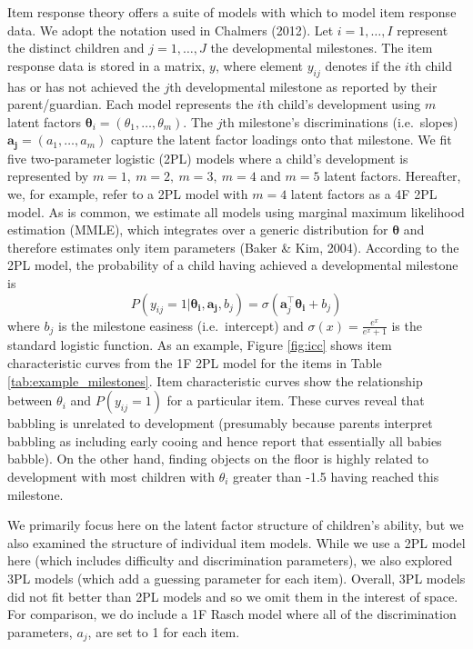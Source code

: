 \documentclass[10pt, letterpaper]{article}
\begin{document}
Item response theory offers a suite of models with which to model item
response data. We adopt the notation used in Chalmers (2012). Let
\(i = 1, \ldots, I\) represent the distinct children and
\(j = 1, \ldots, J\) the developmental milestones. The item response
data is stored in a matrix, \(y\), where element \(y_{ij}\) denotes if
the \(i\)th child has or has not achieved the \(j\)th developmental
milestone as reported by their parent/guardian. Each model represents
the \(i\)th child's development using \(m\) latent factors
\(\boldsymbol{\theta}_{i}=(\theta_1, \dots, \theta_m)\). The \(j\)th
milestone's discriminations (i.e.~slopes)
\(\boldsymbol{a_j}=(a_1, \dots, a_m)\) capture the latent factor
loadings onto that milestone. We fit five two-parameter logistic (2PL)
models where a child's development is represented by
\(m = 1, \ m = 2, \ m = 3, \ m = 4\) and \(m = 5\) latent factors.
Hereafter, we, for example, refer to a 2PL model with \(m = 4\) latent
factors as a 4F 2PL model. As is common, we estimate all models using
marginal maximum likelihood estimation (MMLE), which integrates over a
generic distribution for \(\boldsymbol{\theta}\) and therefore estimates
only item parameters (Baker \& Kim, 2004). According to the 2PL model,
the probability of a child having achieved a developmental milestone is
\[
P(y_{ij} = 1 | \boldsymbol{\theta_i}, \boldsymbol{a_j}, b_j) = \sigma(\boldsymbol{a}_{j}^{\top}\boldsymbol{\theta_i} + b_j)
\] where \(b_j\) is the milestone easiness (i.e.~intercept) and
\(\sigma(x) = \frac{e^x}{e^x + 1}\) is the standard logistic function.
As an example, Figure \ref{fig:icc} shows item characteristic curves
from the 1F 2PL model for the items in Table
\ref{tab:example_milestones}. Item characteristic curves show the
relationship between \(\theta_i\) and \(P(y_{ij} = 1)\) for a particular
item. These curves reveal that babbling is unrelated to development
(presumably because parents interpret babbling as including early cooing
and hence report that essentially all babies babble). On the other hand,
finding objects on the floor is highly related to development with most
children with \(\theta_i\) greater than -1.5 having reached this
milestone.

We primarily focus here on the latent factor structure of children's
ability, but we also examined the structure of individual item models.
While we use a 2PL model here (which includes difficulty and
discrimination parameters), we also explored 3PL models (which add a
guessing parameter for each item). Overall, 3PL models did not fit
better than 2PL models and so we omit them in the interest of space. For
comparison, we do include a 1F Rasch model where all of the
discrimination parameters, \(a_j\), are set to 1 for each item.
\end{document}
